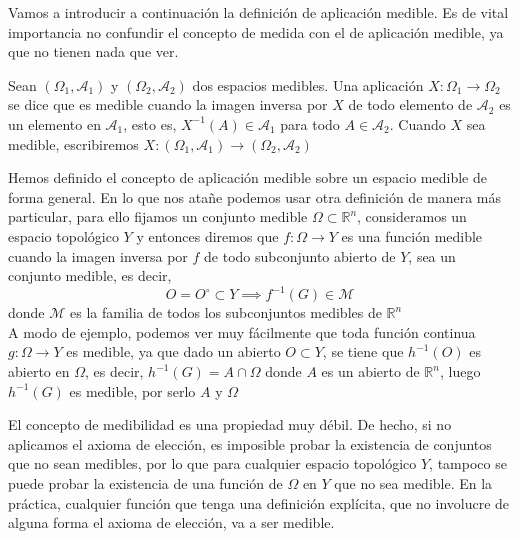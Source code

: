       Vamos a introducir a continuación la definición de aplicación medible. Es de vital importancia no confundir el concepto de medida con el de aplicación medible, ya que no tienen nada que ver.
      
      \begin{definicion}
      Sean $(\Omega_1,\mathcal{A}_1)$ y $(\Omega_2,\mathcal{A}_2)$ dos espacios medibles. Una aplicación $X:\Omega_1 \rightarrow \Omega_2$ se dice que es medible cuando la imagen inversa por $X$ de todo elemento de $\mathcal{A}_2$ es un elemento en $\mathcal{A}_1$, esto es, $X^{-1}(A) \in \mathcal{A}_1$ para todo $A \in \mathcal{A}_2$. Cuando $X$ sea medible, escribiremos $X:(\Omega_1,\mathcal{A}_1) \rightarrow (\Omega_2,\mathcal{A}_2)$
      \end{definicion}
      
      Hemos definido el concepto de aplicación medible sobre un espacio medible de forma general. En lo que nos atañe podemos usar otra definición de manera más particular, para ello fijamos un conjunto medible $\Omega \subset \mathbb{R}^n$, consideramos un espacio topológico $Y$ y entonces diremos que $f:\Omega \to Y$ es una función medible cuando la imagen inversa por $f$ de todo subconjunto abierto de $Y$, sea un conjunto medible, es decir,
      $$O = O^{\circ} \subset Y \implies f^{-1}(G) \in \mathcal{M}$$ donde $\mathcal{M}$ es la familia de todos los subconjuntos medibles de $\mathbb{R}^n$ \\ 
      
      A modo de ejemplo, podemos ver muy fácilmente que toda función continua $g:\Omega \to Y$ es medible, ya que dado un abierto $O \subset Y$, se tiene que $h^{-1}(O)$ es abierto en $\Omega$, es decir, $h^{-1}(G) = A \cap \Omega$ donde $A$ es un abierto de $\mathbb{R}^n$, luego $h^{-1}(G)$ es medible, por serlo $A$ y $\Omega$
       
      \begin{observacion}
      El concepto de medibilidad es una propiedad muy débil. De hecho, si no aplicamos el axioma de elección, es imposible probar la existencia de conjuntos que no sean medibles, por lo que para cualquier espacio topológico $Y$, tampoco se puede probar la existencia de una función de $\Omega$ en $Y$ que no sea medible. En la práctica, cualquier función que tenga una definición explícita, que no involucre de alguna forma el axioma de elección, va a ser medible.
      \end{observacion}
      
   
       
